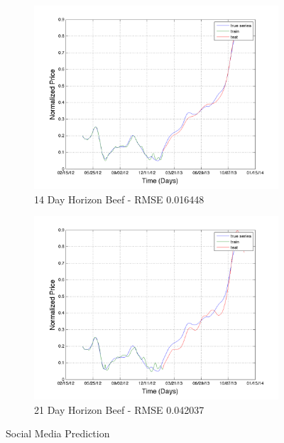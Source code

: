 \begin{figure}
        \begin{subfigure}[b]{0.5\textwidth}
                \includegraphics[width=\textwidth]{img/model/beef/model3_3/pred_14}
                \caption{14 Day Horizon Beef - RMSE 0.016448  }
                \label{fig:tiger}
        \end{subfigure}%
              \begin{subfigure}[b]{0.5\textwidth}
                \includegraphics[width=\textwidth]{img/model/beef/model3_3/pred_21}
                \caption{21 Day Horizon Beef  - RMSE 0.042037 }
                \label{fig:tiger}
        \end{subfigure}%
        \caption{Social Media Prediction}\label{fig:comp_exp}
\end{figure}

